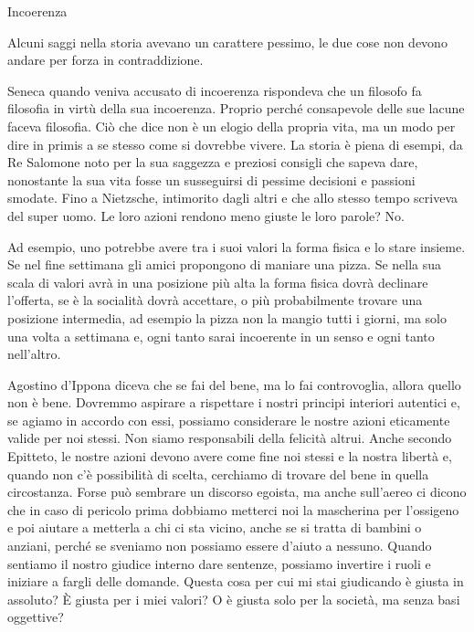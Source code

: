 \documentclass[12pt]{book} %
\begin{document}
\begin{mdframed}[linewidth=1pt]
Incoerenza

Alcuni saggi nella storia avevano un carattere pessimo, le due cose non devono andare per forza in contraddizione. 

Seneca quando veniva accusato di incoerenza rispondeva che un
filosofo fa filosofia in virtù della sua incoerenza. Proprio perché consapevole delle sue lacune faceva filosofia.
Ciò che dice non è un elogio della propria vita, ma un modo per dire in primis a se stesso come si dovrebbe vivere. La
storia è piena di esempi, da Re Salomone noto per la sua saggezza e preziosi consigli che sapeva dare, nonostante la
sua vita fosse un susseguirsi di pessime decisioni e passioni smodate. Fino a Nietzsche, intimorito dagli altri e che
allo stesso tempo scriveva del super uomo. Le loro azioni rendono meno giuste le loro parole? No.

Ad esempio, uno potrebbe avere tra i suoi valori la forma fisica e lo stare insieme. Se nel fine settimana gli amici propongono di maniare una pizza. Se nella sua scala di valori avrà in una posizione più alta la forma fisica dovrà declinare l'offerta, se è la socialità dovrà accettare, o più probabilmente trovare una posizione intermedia, ad esempio la pizza non la mangio tutti i giorni, ma solo una volta a settimana e, ogni tanto sarai incoerente in un senso e ogni tanto nell'altro.
\end{mdframed}

Agostino d'Ippona diceva che se fai del bene, ma lo fai controvoglia, allora quello non è bene. Dovremmo aspirare a rispettare i nostri principi interiori autentici e, se agiamo in accordo con essi, possiamo considerare le nostre azioni eticamente valide per noi stessi. Non siamo responsabili della felicità altrui. Anche secondo Epitteto, le nostre azioni devono avere come fine noi stessi e la nostra libertà e, quando non c'è possibilità di scelta, cerchiamo di trovare del bene in quella circostanza. Forse può sembrare un
discorso egoista, ma anche sull'aereo ci dicono che in caso di pericolo prima dobbiamo
metterci noi la mascherina per l'ossigeno e poi aiutare a metterla a chi ci sta vicino, anche se
si tratta di bambini o anziani, perché se sveniamo non possiamo essere d'aiuto a nessuno. 
Quando sentiamo il nostro giudice interno dare sentenze, possiamo invertire i ruoli e iniziare a fargli delle domande. Questa
cosa per cui mi stai giudicando è giusta in assoluto? È giusta per i miei valori? O è giusta solo per la società, ma senza basi oggettive?
\end{document}
